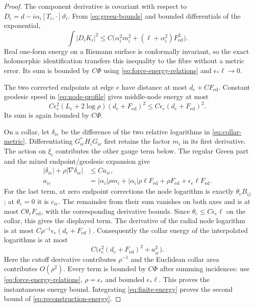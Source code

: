 \begin{proof}
The component derivative is covariant with respect to
$D_i=d-i\alpha_i[T_i,\cdot]\vartheta_i$. From
\eqref{eq:green-bounds} and bounded differentials of the exponential,
\begin{equation}\label{eq:component-energy}
 \int|D_iK_i|^2\le C\bigl(\alpha_i^2m_i^2
                       +(\ell+\alpha_i^2)F_{\mathrm{ed}}^2\bigr).
\end{equation}
Real one-form energy on a Riemann surface is conformally invariant,
so the exact holomorphic identification transfers this inequality
to the fibre without a metric error. Its sum is bounded by $C\Phi$
using \eqref{eq:force-energy-relations} and $\epsilon_*\ell\to0$.

The two corrected endpoints at edge $e$ have distance at most
$d_e+CF_{\mathrm{ed}}$. Constant geodesic speed in
\eqref{eq:node-profile} gives middle-node energy at most
\[
 C\epsilon_e^2(L_e+2\log\rho)(d_e+F_{\mathrm{ed}})^2
       \le C\epsilon_e(d_e+F_{\mathrm{ed}})^2.
\]
Its sum is again bounded by $C\Phi$.

On a collar, let $\delta_{ie}$ be the difference of the two
relative logarithms in \eqref{eq:collar-metric}. Differentiating
$G_{ie}^*H_iG_{ie}$ first retains the factor $m_i$ in its first
derivative. The action on $\xi_i$ contributes the other gauge
term below. The regular Green part and the mixed endpoint/geodesic
expansion give
\begin{equation}\label{eq:collar-discrepancy}
 \begin{split}
 |\delta_{ie}|+\rho|\nabla\delta_{ie}|&\le C a_{ie},\\
 a_{ie}&=|\alpha_i|\rho m_i+
       |\alpha_i|\rho\ell F_{\mathrm{ed}}+
       \rho F_{\mathrm{ed}}+\epsilon_e\ell F_{\mathrm{ed}}.
 \end{split}
\end{equation}
For the last term, at zero endpoint corrections the node logarithm
is exactly $\theta_e B_{ij}$; at $\theta_e=0$ it is $c_{ie}$.
The remainder from their sum vanishes on both axes and is at most
$C\theta_e F_{\mathrm{ed}}$, with the corresponding derivative
bounds. Since $\theta_e\le C\epsilon_e\ell$ on the collar,
this gives the displayed term. The derivative of the radial node
logarithm is at most
$C\rho^{-1}\epsilon_e(d_e+F_{\mathrm{ed}})$.
Consequently the collar energy of the interpolated logarithms is
at most
\[
 C\bigl(\epsilon_e^2(d_e+F_{\mathrm{ed}})^2+a_{ie}^2\bigr).
\]
Here the cutoff derivative contributes $\rho^{-1}$ and the
Euclidean collar area contributes $O(\rho^2)$. Every term is
bounded by $C\Phi$ after summing incidences: use
\eqref{eq:force-energy-relations}, $\rho=\epsilon_*$ and bounded
$\epsilon_*\ell$. This proves the instantaneous energy bound.
Integrating \eqref{eq:finite-energy} proves the second bound of
\eqref{eq:reconstruction-energy}.


\end{proof}
